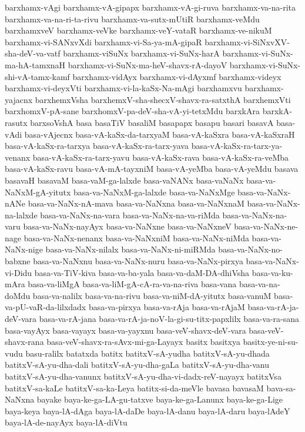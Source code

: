 {barxhamx-vAgi
barxhamx-vA-gipapx
barxhamx-vA-gi-ruva
barxhamx-va-na-rita
barxhamx-va-na-ri-ta-rivu
barxhamx-va-sutx-mUtiR
barxhamx-veMdu
barxhamxveV
barxhamx-veVke
barxhamx-veY-vataR
barxhamx-ve-nikuM
barxhamx-vi-SANxvXdi
barxhamx-vi-Sa-ya-mA-gipaR
barxhamx-vi-SiNxvXV-sha-deV-va-vatf
barxhamx-viSuNx
barxhamx-vi-SuNx-harA
barxhamx-vi-SuNx-ma-hA-tamxnaH
barxhamx-vi-SuNx-ma-heV-shavx-rA-dayoV
barxhamx-vi-SuNx-shi-vA-tamx-kamf
barxhamx-vidAyx
barxhamx-vi-dAyxmf
barxhamx-videyx
barxhamx-vi-deyxVti
barxhamx-vi-la-kaSx-Na-mAgi
barxhamxvu
barxhamx-yajacnx
barxhemxVsha
barxhemxV-sha-shecxV-shavx-ra-satxthA
barxhemxVti
barxhomxV-pA-sane
barxhomxV-pa-deV-sha-vA-yi-tetxMdu
barxkAra
barxkA-rasutx
barxsoVshA
basa
basaTiV
basaliM
basapapx
basapu
basari
basavA
basa-vAdi
basa-vAjecnx
basa-vA-kaSx-da-tarxyaM
basa-vA-kaSxra
basa-vA-kaSxraH
basa-vA-kaSx-ra-tarxya
basa-vA-kaSx-ra-tarx-yava
basa-vA-kaSx-ra-tarx-ya-venanx
basa-vA-kaSx-ra-tarx-yavu
basa-vA-kaSx-rava
basa-vA-kaSx-ra-veMba
basa-vA-kaSx-ravu
basa-vA-mA-tayxniM
basa-vA-yeMba
basa-vA-yeMdu
basava
basavaH
basavaM
basa-vaM-ga-lalxde
basa-vaNANx
basa-vaNaNx
basa-va-NaNxM-gA-yitutx
basa-va-NaNxM-ga-lalxde
basa-va-NaNxMge
basa-va-NaNx-nANe
basa-va-NaNx-nA-mava
basa-va-NaNxna
basa-va-NaNxnaM
basa-va-NaNx-na-lalxde
basa-va-NaNx-na-vara
basa-va-NaNx-na-va-riMda
basa-va-NaNx-na-varu
basa-va-NaNx-nayAyx
basa-va-NaNxne
basa-va-NaNxneV
basa-va-NaNx-ne-nage
basa-va-NaNx-nenanx
basa-va-NaNxniM
basa-va-NaNx-niMda
basa-va-NaNx-nige
basa-va-NaNx-nilalx
basa-va-NaNx-ni-miRMda
basa-va-NaNx-no-babxne
basa-va-NaNxnu
basa-va-NaNx-nuru
basa-va-NaNx-pirxya
basa-va-NaNx-vi-Didu
basa-va-TiV-kiva
basa-va-ba-yala
basa-va-daM-DA-dhiVsha
basa-va-ku-mAra
basa-va-liMgA
basa-va-liM-gA-cA-ra-va-na-riva
basa-vana
basa-va-na-doMdu
basa-va-nalilx
basa-va-na-rivu
basa-va-niM-dA-yitutx
basa-vanuM
basa-va-pU-vaR-da-lilxdadx
basa-va-pirxya
basa-va-rAja
basa-va-rAjaM
basa-va-rA-ja-deV-vara
basa-va-rA-jana
basa-va-rA-ja-noV-la-gi-su-titx-papxlilx
basa-va-ra-sana
basa-vayAyx
basa-vayayx
basa-va-yayxnu
basa-veV-shavx-deV-vara
basa-veV-shavx-rana
basa-veV-shavx-ra-sAvx-mi-ga-Layayx
basitx
basitxya
basitx-ye-ni-su-vudu
basu-ralilx
batatxda
batitx
batitxV-sA-yudha
batitxV-sA-yu-dhada
batitxV-sA-yu-dha-dali
batitxV-sA-yu-dha-gaLa
batitxV-sA-yu-dha-vanu
batitxV-sA-yu-dha-vanunx
batitxV-sA-yu-dha-vi-dadx-reV-nayayx
batitxVsa
batitxV-sa-kaLe
batitxV-sa-ka-Leya
batitx-si-da-meVle
bavasa
bavasaM
bava-sa-NaNxna
bayake
baya-ke-ga-LA-gu-tatxve
baya-ke-ga-Lanunx
baya-ke-ga-Lige
baya-keya
baya-lA-dAga
baya-lA-daDe
baya-lA-danu
baya-lA-daru
baya-lAdeY
baya-lA-de-nayAyx
baya-lA-diVtu
}
